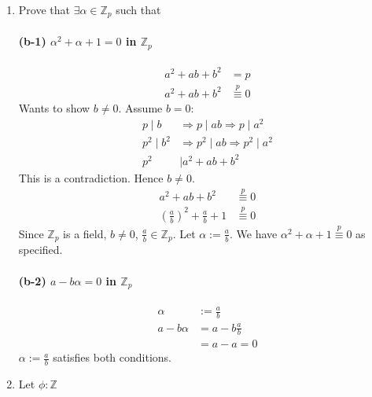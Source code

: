 \documentclass[12pt]{article}
\begin{document}
\begin{enumerate}
\begin{enumerate}
		\item Prove that $\exists \alpha \in \mathbb{Z}_p$ such that
			\paragraph{(b-1) $\alpha^2 + \alpha + 1 = 0$ in $\mathbb{Z}_p$}
				\begin{align*}
					a^2 + ab+b^2 &= p\\
					a^2 + ab+b^2 &\overset{p}{\equiv} 0
				\end{align*}
				Wants to show $b \neq 0$. Assume $b=0$:
				\begin{align*}
					p \mid b &\Rightarrow p \mid ab \Rightarrow p\mid a^2\\
					p^2 \mid b^2 &\Rightarrow p^2 \mid ab \Rightarrow p^2\mid a^2\\
					p^2 &\mid a^2 + ab+b^2
				\end{align*}
				This is a contradiction. Hence $b \neq 0$.
				\begin{align*}
					a^2 + ab+b^2 &\overset{p}{\equiv} 0\\
					\left(\frac{a}{b}\right)^2 + \frac{a}{b}+1 &\overset{p}{\equiv} 0
				\end{align*}
				Since $\mathbb{Z}_p$ is a field, $b \neq 0$, $\frac{a}{b} \in
				\mathbb{Z}_p$. Let $\alpha := \frac{a}{b}$. We have 
				$\alpha^2 + \alpha + 1 \overset{p}{\equiv} 0$ as specified.

			\paragraph{(b-2) $a - b\alpha = 0$ in $\mathbb{Z}_p$}
			\begin{align*}
				\alpha &:= \frac{a}{b}\\
				a - b\alpha &= a - b\frac{a}{b}\\
										&= a - a = 0
			\end{align*}
			$\alpha := \frac{a}{b}$ satisfies both conditions.

		\item Let $\phi:\mathbb{Z}$
	\end{enumerate}

\end{enumerate}
\end{document}

